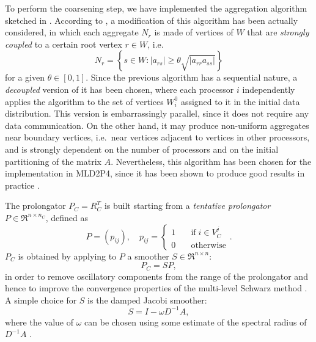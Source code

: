 To perform the coarsening step, we have implemented the aggregation algorithm sketched
in \cite{apnum_07}. According to \cite{brezina_vanek}, a modification of this algorithm
has been actually considered,
in which each aggregate $N_r$ is made of vertices of $W$ that are \emph{strongly coupled}
to a certain root vertex $r \in W$, i.e.\
\[  N_r = \left\{s \in W: |a_{rs}| \geq \theta \sqrt{|a_{rr}a_{ss}|} \right\} \]
for a given $\theta \in [0,1]$.
Since the previous algorithm has a sequential nature, a \emph{decoupled} version of
it has been chosen, where each processor $i$ independently applies the algorithm to
the set of vertices $W_i^0$ assigned to it in the initial data distribution. This
version is embarrassingly parallel, since it does not require any data communication.
On the other hand, it may produce non-uniform aggregates near boundary vertices,
i.e.\ near vertices adjacent to vertices in other processors, and is strongly
dependent on the number of processors and on the initial partitioning of the matrix $A$.
Nevertheless, this algorithm has been chosen for the implementation in MLD2P4,
since it has been shown to produce good results in practice \cite{Tuminaro_Tong_00}.

The prolongator $P_C=R_C^T$ is built starting from a \emph{tentative prolongator}
$P \in \Re^{n \times n_C}$, defined as
\begin{equation} 
P=(p_{ij}), \quad  p_{ij}= 
\left\{ \begin{array}{ll}
1 & \quad \mbox{if} \; i \in V^j_C \\
0 & \quad \mbox{otherwise}
\end{array} \right. .
\label{eq:tent_prol}
\end{equation}
$P_C$ is obtained by
applying to $P$ a smoother $S \in \Re^{n \times n}$:
\begin{equation}
P_C = S P,
\label{eq:smoothed_prol}
\end{equation}
in order to remove oscillatory components from the range of the prolongator
and hence to improve the convergence properties of the multi-level
Schwarz method \cite{Brezina_Vanek_,StubenGMD69_99}.
A simple choice for $S$ is the damped Jacobi smoother:
\begin{equation}
S = I - \omega D^{-1} A , 
\label{eq:jac_smoother}
\end{equation}
where the value of $\omega$ can be chosen
using some estimate of the spectral radius of $D^{-1}A$ \cite{Brezina_Vanek}.
%
%

